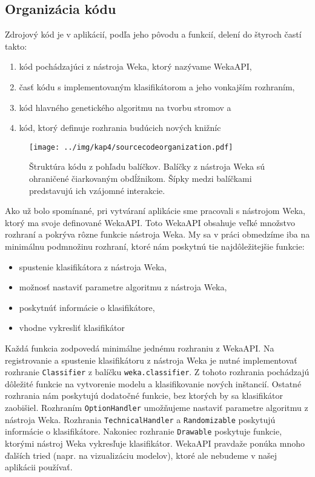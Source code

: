 \pagebreak

\subsection{Organizácia kódu}\label{kap4:4.2:4.2.2:CodeOrganization}
Zdrojový kód je v aplikácií, podľa jeho pôvodu a funkcií, delení do štyroch častí takto:
\begin{enumerate}
\item kód pochádzajúci z nástroja Weka, ktorý nazývame WekaAPI,
\item časť kódu s implementovaným klasifikátorom a jeho vonkajším rozhraním,
\item kód hlavného genetického algoritmu na tvorbu stromov a
\item kód, ktorý definuje rozhrania budúcich nových knižníc
\end{enumerate}

\begin{figure}[h]
\centering
\centerline{\mbox{\texttt{[image: ../img/kap4/sourcecodeorganization.pdf]}}}
\caption{Štruktúra kódu z pohľadu balíčkov. Balíčky z nástroja Weka sú ohraničené čiarkovaným obdĺžnikom. Šípky medzi balíčkami predstavujú ich vzájomné interakcie.}\label{fig:GenLibPackage}
\end{figure}

Ako už bolo spomínané, pri vytváraní aplikácie sme pracovali s nástrojom Weka, ktorý ma svoje definované WekaAPI. Toto WekaAPI obsahuje veľké množstvo rozhraní a pokrýva rôzne funkcie nástroja Weka. My sa v práci obmedzíme iba na minimálnu podmnožinu rozhraní, ktoré nám poskytnú tie najdôležitejšie funkcie:
\begin{itemize}
\item spustenie klasifikátora z nástroja Weka,
\item možnosť nastaviť parametre algoritmu z nástroja Weka,
\item poskytnúť informácie o klasifikátore,
\item vhodne vykresliť klasifikátor
\end{itemize}
Každá funkcia zodpovedá minimálne jednému rozhraniu z WekaAPI. Na registrovanie a spustenie klasifikátoru z nástroja Weka je nutné implementovať rozhranie \verb|Classifier| z balíčku \verb|weka.classifier|. Z tohoto rozhrania pochádzajú dôležité funkcie na vytvorenie modelu a klasifikovanie nových inštancií. Ostatné rozhrania nám poskytujú dodatočné funkcie, bez ktorých by sa klasifikátor zaobišiel. Rozhraním \verb|OptionHandler| umožňujeme nastaviť parametre algoritmu z nástroja Weka. Rozhrania \verb|TechnicalHandler| a \verb|Randomizable| poskytujú informácie o klasifikátore. Nakoniec rozhranie \verb|Drawable| poskytuje funkcie, ktorými nástroj Weka vykresľuje klasifikátor. WekaAPI pravdaže ponúka mnoho ďalších tried (napr. na vizualizáciu modelov), ktoré ale nebudeme v našej aplikácii používať.

